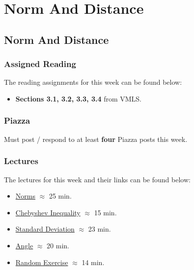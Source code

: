 \clearpage

\renewcommand{\ChapTitle}{Norm And Distance}
\renewcommand{\SectionTitle}{Norm And Distance}

\chapter{\ChapTitle}
\section{\SectionTitle}

\subsection{Assigned Reading}

The reading assignments for this week can be found below:

\begin{itemize}
    \item \textbf{Sections 3.1, 3.2, 3.3, 3.4} from VMLS.
\end{itemize}

\subsection{Piazza}

Must post / respond to at least \textbf{four} Piazza posts this week.  

\subsection{Lectures}

The lectures for this week and their links can be found below:

\begin{itemize}
    \item \href{https://applied.cs.colorado.edu/mod/hvp/view.php?id=50692}{Norms} $\approx$ 25 min.
    \item \href{https://applied.cs.colorado.edu/mod/hvp/view.php?id=50693}{Chebyshev Inequality} $\approx$ 15 min.
    \item \href{https://applied.cs.colorado.edu/mod/hvp/view.php?id=50694}{Standard Deviation} $\approx$ 23 min.
    \item \href{https://applied.cs.colorado.edu/mod/hvp/view.php?id=50695}{Angle} $\approx$ 20 min.
    \item \href{https://applied.cs.colorado.edu/mod/hvp/view.php?id=50696}{Random Exercise} $\approx$ 14 min.
\end{itemize}

